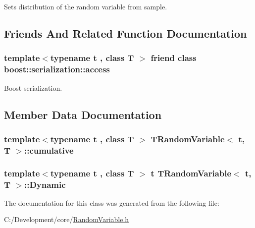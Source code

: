 Sets distribution of the random variable from sample. 



\subsection{Friends And Related Function Documentation}
\hypertarget{class_t_random_variable_ac98d07dd8f7b70e16ccb9a01abf56b9c}{
\subsubsection[{boost\-::serialization\-::access}]{\setlength{\rightskip}{0pt plus 5cm}template$<$typename t , class T $>$ friend class boost\-::serialization\-::access\hspace{0.3cm}{\ttfamily [friend]}}}\label{class_t_random_variable_ac98d07dd8f7b70e16ccb9a01abf56b9c}


Boost serialization. 



\subsection{Member Data Documentation}
\hypertarget{class_t_random_variable_a85c929f5f072f475c65849859bfa1e5e}{
\subsubsection[{cumulative}]{\setlength{\rightskip}{0pt plus 5cm}template$<$typename t , class T $>$ {\bf T\-Random\-Variable}$<$ t, T $>$\-::cumulative}}\label{class_t_random_variable_a85c929f5f072f475c65849859bfa1e5e}
\hypertarget{class_t_random_variable_ad33d760f0f0d75be0de72fc811d7e130}{
\subsubsection[{Dynamic}]{\setlength{\rightskip}{0pt plus 5cm}template$<$typename t , class T $>$ t {\bf T\-Random\-Variable}$<$ t, T $>$\-::Dynamic}}\label{class_t_random_variable_ad33d760f0f0d75be0de72fc811d7e130}


The documentation for this class was generated from the following file\-:\begin{DoxyCompactItemize}
\item 
C\-:/\-Development/core/\hyperlink{_random_variable_8h}{Random\-Variable.\-h}\end{DoxyCompactItemize}
